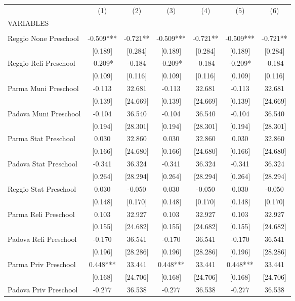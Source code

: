 \begin{tabular}{lcccccc} \hline
 & (1) & (2) & (3) & (4) & (5) & (6) \\
VARIABLES &  &  &  &  &  &  \\ \hline
 &  &  &  &  &  &  \\
Reggio None Preschool & -0.509*** & -0.721** & -0.509*** & -0.721** & -0.509*** & -0.721** \\
 & [0.189] & [0.284] & [0.189] & [0.284] & [0.189] & [0.284] \\
Reggio Reli Preschool & -0.209* & -0.184 & -0.209* & -0.184 & -0.209* & -0.184 \\
 & [0.109] & [0.116] & [0.109] & [0.116] & [0.109] & [0.116] \\
Parma Muni Preschool & -0.113 & 32.681 & -0.113 & 32.681 & -0.113 & 32.681 \\
 & [0.139] & [24.669] & [0.139] & [24.669] & [0.139] & [24.669] \\
Padova Muni Preschool & -0.104 & 36.540 & -0.104 & 36.540 & -0.104 & 36.540 \\
 & [0.194] & [28.301] & [0.194] & [28.301] & [0.194] & [28.301] \\
Parma Stat Preschool & 0.030 & 32.860 & 0.030 & 32.860 & 0.030 & 32.860 \\
 & [0.166] & [24.680] & [0.166] & [24.680] & [0.166] & [24.680] \\
Padova Stat Preschool & -0.341 & 36.324 & -0.341 & 36.324 & -0.341 & 36.324 \\
 & [0.264] & [28.294] & [0.264] & [28.294] & [0.264] & [28.294] \\
Reggio Stat Preschool & 0.030 & -0.050 & 0.030 & -0.050 & 0.030 & -0.050 \\
 & [0.148] & [0.170] & [0.148] & [0.170] & [0.148] & [0.170] \\
Parma Reli Preschool & 0.103 & 32.927 & 0.103 & 32.927 & 0.103 & 32.927 \\
 & [0.155] & [24.682] & [0.155] & [24.682] & [0.155] & [24.682] \\
Padova Reli Preschool & -0.170 & 36.541 & -0.170 & 36.541 & -0.170 & 36.541 \\
 & [0.196] & [28.286] & [0.196] & [28.286] & [0.196] & [28.286] \\
Parma Priv Preschool & 0.448*** & 33.441 & 0.448*** & 33.441 & 0.448*** & 33.441 \\
 & [0.168] & [24.706] & [0.168] & [24.706] & [0.168] & [24.706] \\
Padova Priv Preschool & -0.277 & 36.538 & -0.277 & 36.538 & -0.277 & 36.538 \\

\end{tabular}
